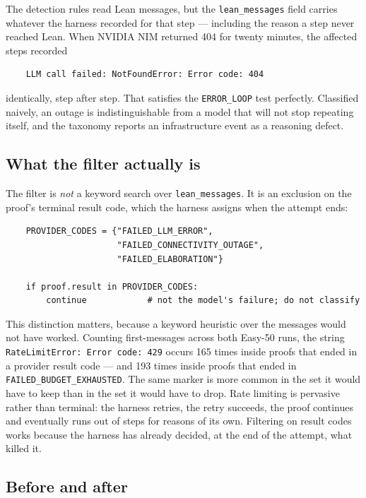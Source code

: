 The detection rules read Lean messages, but the \texttt{lean\_messages} field
carries whatever the harness recorded for that step --- including the reason a
step never reached Lean. When NVIDIA NIM returned 404 for twenty minutes, the
affected steps recorded

\begin{verbatim}
    LLM call failed: NotFoundError: Error code: 404
\end{verbatim}

\noindent identically, step after step. That satisfies the \texttt{ERROR\_LOOP}
test perfectly. Classified naively, an outage is indistinguishable from a model
that will not stop repeating itself, and the taxonomy reports an infrastructure
event as a reasoning defect.

\subsection{What the filter actually is}

The filter is \emph{not} a keyword search over \texttt{lean\_messages}.
It is an exclusion on the proof's terminal result code, which the harness
assigns when the attempt ends:

\begin{verbatim}
    PROVIDER_CODES = {"FAILED_LLM_ERROR",
                      "FAILED_CONNECTIVITY_OUTAGE",
                      "FAILED_ELABORATION"}

    if proof.result in PROVIDER_CODES:
        continue            # not the model's failure; do not classify
\end{verbatim}

This distinction matters, because a keyword heuristic over the messages would
not have worked. Counting first-messages across both Easy-50 runs, the string
\texttt{RateLimitError: Error code: 429} occurs 165 times inside proofs that
ended in a provider result code --- and 193 times inside proofs that ended in
\texttt{FAILED\_BUDGET\_EXHAUSTED}. The same marker is more common in the set it
would have to keep than in the set it would have to drop. Rate limiting is
pervasive rather than terminal: the harness retries, the retry succeeds, the
proof continues and eventually runs out of steps for reasons of its own.
Filtering on result codes works because the harness has already decided, at the
end of the attempt, what killed it.

\subsection{Before and after}

